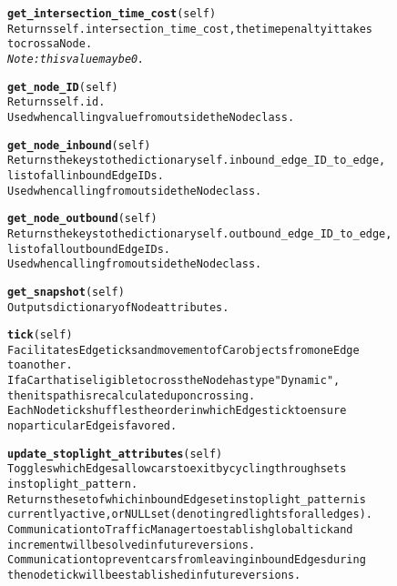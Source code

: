 \begin{alltt}
\textbf{get_intersection_time_cost}(self)
Returns self.intersection_time_cost, the time penalty it takes 
to cross a Node.
\textit{Note:  this value may be 0.}

\textbf{get_node_ID}(self)
Returns self.id.
Used when calling value from outside the Node class.

\textbf{get_node_inbound}(self)
Returns the keys to the dictionary self.inbound_edge_ID_to_edge, 
list of all inbound Edge IDs.
Used when calling from outside the Node class.

\textbf{get_node_outbound}(self)
Returns the keys to the dictionary self.outbound_edge_ID_to_edge, 
list of all outbound Edge IDs.
Used when calling from outside the Node class.

\textbf{get_snapshot}(self)
Outputs dictionary of Node attributes.

\textbf{tick}(self)
Facilitates Edge ticks and movement of Car objects from one Edge 
to another.
If a Car that is eligible to cross the Node has type "Dynamic", 
then its path is recalculated upon crossing.
Each Node tick shuffles the order in which Edges tick to ensure 
no particular Edge is favored.

\textbf{update_stoplight_attributes}(self)
Toggles which Edges allow cars to exit by cycling through sets 
in stoplight_pattern.
Returns the set of which inbound Edge set in stoplight_pattern is
currently active, or NULL set (denoting red lights for all edges).
Communication to TrafficManager to establish global tick and 
increment will be solved in future versions.
Communication to prevent cars from leaving inbound Edges during 
the node tick will be established in future versions.



\end{alltt}



